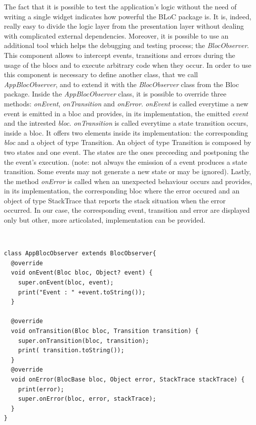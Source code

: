 The fact that it is possible to test the application's logic without the need of writing a single widget indicates how powerful the BLoC package is. It is, indeed, really easy to divide the logic layer from the presentation layer without dealing with complicated external dependencies. Moreover, it is possible to use an additional tool which helps the debugging and testing process; the \textit{BlocObserver}. This component allows to intercept events, transitions and errors during the usage of the blocs and to execute arbitrary code when they occur. In order to use this component is necessary to define another class,  that we call \textit{AppBlocObserver}, and to extend it with the \textit{BlocObserver} class from the Bloc package. Inside the \textit{AppBlocObserver} class, it is possible to override three methods: \textit{onEvent}, \textit{onTransition }and\textit{ onError}. \textit{onEvent} is called everytime a new event is emitted in a bloc and provides, in its implementation, the emitted \textit{event} and the intrested \textit{bloc}. \textit{onTransition} is called everytime a state transition occurs, inside a bloc. It offers two elements inside its implementation: the corresponding \textit{bloc} and a object of type Transition. An object of type Transition is composed by two states and one event. The states are the ones preceeding and postponing the the event's execution. (note: not always the emission of a event produces a state transition. Some events may not generate a new state or may be ignored). Lastly, the method \textit{onError} is called when an unexpected behaviour occurs and provides,  in its implementation, the corresponding bloc where the error occured and an object of type StackTrace that reports the stack situation when the error occurred. In our case, the corresponding event, transition and error are displayed only but other, more articolated,  implementation can be provided.
\begin{code}
\mbox{}\\
 \mbox{}
\label{code:2.14}
\begin{verbatim}
class AppBlocObserver extends BlocObserver{
  @override
  void onEvent(Bloc bloc, Object? event) {
    super.onEvent(bloc, event);
    print("Event : " +event.toString());
  }

  @override
  void onTransition(Bloc bloc, Transition transition) {
    super.onTransition(bloc, transition);
    print( transition.toString());
  }
  @override
  void onError(BlocBase bloc, Object error, StackTrace stackTrace) {
    print(error);
    super.onError(bloc, error, stackTrace);
  }
}
\end{verbatim}
\mbox{}
\end{code}

